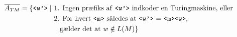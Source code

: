 \begin{align*}
	\overline{A_{TM}} = \{\text{\texttt{<w'>}} \mid
	 & \text{ 1. Ingen præfiks af \texttt{<w'>} indkoder en Turingmaskine, eller }   \\
	 & \text{ 2. For hvert \texttt{<m>} således at \texttt{<w'>} = \texttt{<m><w>},} \\ &\;\;\; \text{           gælder det at } w \notin L(M)
	\}
\end{align*}



